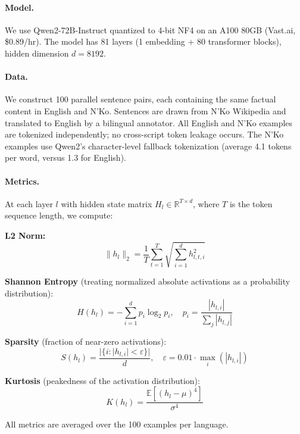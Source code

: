 \documentclass[11pt]{article}
\begin{document}
\paragraph{Model.}
We use Qwen2-72B-Instruct quantized to 4-bit NF4 on an A100 80GB (Vast.ai, \$0.89/hr).
The model has 81 layers (1 embedding + 80 transformer blocks), hidden dimension $d = 8192$.

\paragraph{Data.}
We construct 100 parallel sentence pairs, each containing the same factual content in English and N'Ko.
Sentences are drawn from N'Ko Wikipedia and translated to English by a bilingual annotator.
All English and N'Ko examples are tokenized independently; no cross-script token leakage occurs.
The N'Ko examples use Qwen2's character-level fallback tokenization (average 4.1 tokens per word, versus 1.3 for English).

\paragraph{Metrics.}
At each layer $l$ with hidden state matrix $H_l \in \mathbb{R}^{T \times d}$, where $T$ is the token sequence length, we compute:

\textbf{L2 Norm:}
\begin{equation}
\|h_l\|_2 = \frac{1}{T} \sum_{t=1}^{T} \sqrt{\sum_{i=1}^{d} h_{l,t,i}^2}
\end{equation}

\textbf{Shannon Entropy} (treating normalized absolute activations as a probability distribution):
\begin{equation}
H(h_l) = -\sum_{i=1}^{d} p_i \log_2 p_i, \quad p_i = \frac{|h_{l,i}|}{\sum_j |h_{l,j}|}
\end{equation}

\textbf{Sparsity} (fraction of near-zero activations):
\begin{equation}
S(h_l) = \frac{|\{i : |h_{l,i}| < \varepsilon\}|}{d}, \quad \varepsilon = 0.01 \cdot \max_i(|h_{l,i}|)
\end{equation}

\textbf{Kurtosis} (peakedness of the activation distribution):
\begin{equation}
K(h_l) = \frac{\mathbb{E}\left[(h_l - \mu)^4\right]}{\sigma^4}
\end{equation}

All metrics are averaged over the 100 examples per language.
\end{document}
